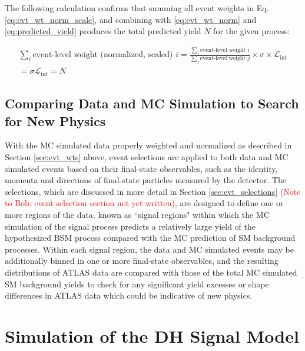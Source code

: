 \noindent The following calculation confirms that summing all event weights in Eq. \ref{eq:evt_wt_norm_scale}, and combining with \ref{eq:evt_wt_norm} and \ref{eq:predicted_yield} produces the total predicted yield \(N\) for the given process:

\begin{multline}
\label{eq:evt_wt_sum}
\sum_i\text{event-level weight (normalized, scaled) }i = \frac{\sum_i \text{event-level weight }i}{\sum_j \text{event-level weight }j}\times \sigma \times \mathcal{L}_\text{int} \\
 = \sigma\mathcal{L}_\text{int} = N
\end{multline}

\subsection{Comparing Data and MC Simulation to Search for New Physics}

With the MC simulated data properly weighted and normalized as described in Section \ref{sec:evt_wts} above, event selections are applied to both data and MC simulated events based on their final-state observables, such as the identity, momenta and directions of final-state particles measured by the detector. The selections, which are discussed in more detail in Section \ref{sec:evt_selections} \textcolor{red}{(Note to Bob: event selection section not yet written)}, are designed to define one or more regions of the data, known as ``signal regions" within which the MC simulation of the signal process predicts a relatively large yield of the hypothesized BSM process compared with the MC prediction of SM background processes. Within each signal region, the data and MC simulated events may be additionally binned in one or more final-state observables, and the resulting distributions of ATLAS data are compared with those of the total MC simulated SM background yields to check for any significant yield excesses or shape differences in ATLAS data which could be indicative of new physics.

\section{Simulation of the DH Signal Model}
\label{sec:DH_model_sim}

